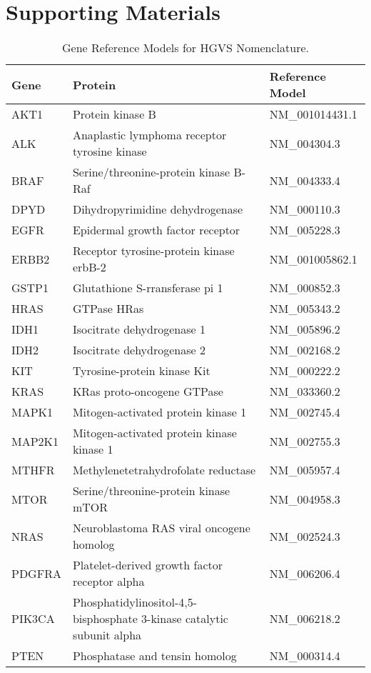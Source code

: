 \chapter{Supporting Materials}

\normalsize
\begin{table}
    \caption{Gene Reference Models for HGVS Nomenclature.}
    \label{tbl:genemodel}
    \centering
    \begin{tabular}{ l l l }\toprule
    Gene & Protein & Reference Model \\
    \midrule
    AKT1 & Protein kinase B & NM\_001014431.1 \\
    ALK & Anaplastic lymphoma receptor tyrosine kinase & NM\_004304.3 \\
    BRAF & Serine/threonine-protein kinase B-Raf & NM\_004333.4 \\
    DPYD & Dihydropyrimidine dehydrogenase & NM\_000110.3 \\
    EGFR & Epidermal growth factor receptor & NM\_005228.3 \\
    ERBB2 & Receptor tyrosine-protein kinase erbB-2 & NM\_001005862.1 \\
    GSTP1 & Glutathione S-rransferase pi 1 & NM\_000852.3 \\
    HRAS & GTPase HRas & NM\_005343.2 \\
    IDH1 & Isocitrate dehydrogenase 1 & NM\_005896.2 \\
    IDH2 & Isocitrate dehydrogenase 2 & NM\_002168.2 \\
    KIT & Tyrosine-protein kinase Kit & NM\_000222.2 \\
    KRAS & KRas proto-oncogene GTPase & NM\_033360.2 \\
    MAPK1 & Mitogen-activated protein kinase 1 & NM\_002745.4 \\
    MAP2K1 & Mitogen-activated protein kinase kinase 1 & NM\_002755.3 \\
    MTHFR & Methylenetetrahydrofolate reductase & NM\_005957.4 \\
    MTOR & Serine/threonine-protein kinase mTOR & NM\_004958.3 \\
    NRAS & Neuroblastoma RAS viral oncogene homolog & NM\_002524.3 \\
    PDGFRA & Platelet-derived growth factor receptor alpha & NM\_006206.4 \\
    PIK3CA & Phosphatidylinositol-4,5-bisphosphate 3-kinase catalytic subunit alpha & NM\_006218.2 \\
    PTEN & Phosphatase and tensin homolog & NM\_000314.4 \\

\end{tabular}
\end{table}
